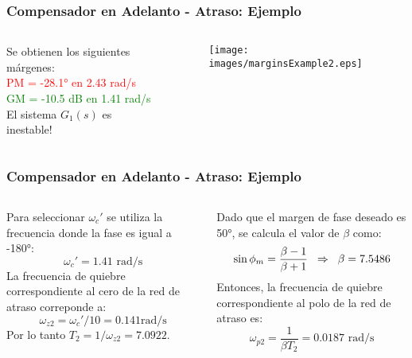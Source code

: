 \documentclass[aspectratio=169, handout]{beamer}
\theoremstyle{definition}
\theoremstyle{plain}
\theoremstyle{remark}
\begin{document}
\begin{frame}[<+->]\frametitle{Compensador en Adelanto - Atraso: Ejemplo}
	\begin{columns}
		\begin{column}{0.4\textwidth}
			Se obtienen los siguientes márgenes:\\
			\vspace*{2mm}
			\textcolor{red}{PM = -\ang{28.1} en 2.43 rad/s}\\
			\vspace*{2mm}
			\textcolor{green}{GM = -10.5 dB en 1.41 rad/s}\\
			\vspace*{2mm}
			El sistema $G_1(s)$ es inestable!
		\end{column}
		\begin{column}{0.6\textwidth}
			\begin{figure}
				\centering
				\texttt{[image: images/marginsExample2.eps]}
			\end{figure}
		\end{column}
	\end{columns}
\end{frame}

\begin{frame}[<+->]\frametitle{Compensador en Adelanto - Atraso: Ejemplo}
	\begin{columns}
		\begin{column}{0.5\textwidth}
			Para seleccionar $\omega_c'$ se utiliza la frecuencia donde la fase es igual a -\ang{180}:
			\begin{equation*}
				\omega_c' = 1.41 \text{ rad/s}
			\end{equation*}
			La frecuencia de quiebre correspondiente al cero de la red de atraso correponde a:
			\begin{equation*}
				\omega_{z2} = \omega_c'/10 = 0.141 \text{rad/s}
			\end{equation*}
			Por lo tanto $T_2 = 1/\omega_{z2} = 7.0922$.
		\end{column}
		\begin{column}{0.5\textwidth}
			Dado que el margen de fase deseado es \ang{50}, se calcula el valor de $\beta$ como:
			\begin{equation*}
				\sin \phi_m = \frac{\beta-1}{\beta+1} \hspace*{2mm} \Rightarrow \hspace*{2mm} \beta = 7.5486
			\end{equation*}
			Entonces, la frecuencia de quiebre correspondiente al polo de la red de atraso es:
			\begin{equation*}
				\omega_{p2} = \frac{1}{\beta T_2} = 0.0187 \text{ rad/s}
			\end{equation*}
		\end{column}
	\end{columns}
\end{frame}
\end{document}
